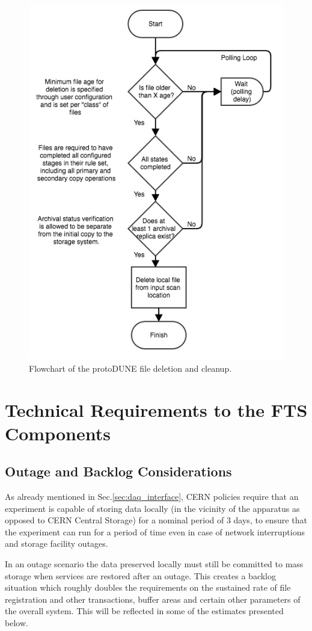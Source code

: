 \documentclass[12pt]{article}
\newcommand{\pd}{protoDUNE\xspace}
\begin{document}
{\begin{figure}[tbh]
  \centering
  \includegraphics[width=0.55\linewidth]{figures/fts_file_deletion_flowchart.png}  
  \caption{Flowchart of the \pd file deletion and cleanup.}
  \label{fig:ftscleanup}
\end{figure}


 
\section{Technical Requirements to the FTS Components}

\subsection{Outage and Backlog Considerations}
\label{sec:backlog}
As already mentioned in Sec.\ref{sec:daq_interface},
CERN policies require that an experiment is capable of storing data locally (in the vicinity of the apparatus as opposed to CERN Central
Storage)  for a nominal period of 3 days, to ensure that the experiment can run for a period of time even in case of network interruptions
and storage facility outages.

In an outage scenario the data preserved locally must still be committed to mass storage when services are
restored after an outage. This creates a backlog situation which roughly doubles the requirements on the sustained
rate of file registration and other transactions, buffer areas and certain other parameters of the overall system.
This will be reflected in some of the estimates presented below.


}
\end{document}
